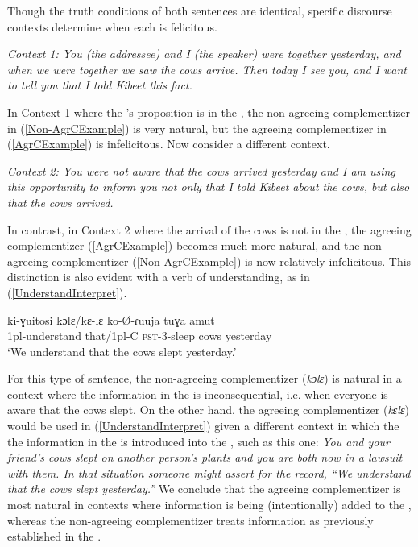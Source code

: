 \documentclass[output=paper
,newtxmath
,modfonts
,nonflat]{langsci/langscibook}
\begin{document}
\noindent Though the  truth conditions of both sentences are identical, specific discourse contexts determine when each is felicitous. 

\ea \textit{Context 1: You (the addressee) and I (the speaker) were together yesterday, and when we were together we saw the cows arrive. Then today I see you, and I want to tell you that I told Kibeet this fact.}  
\z

\noindent In Context 1 where the 's proposition is in the , the non-agreeing complementizer in (\ref{Non-AgrCExample}) is very natural, but the agreeing complementizer in (\ref{AgrCExample}) is infelicitous. Now consider a different context.

\ea \textit{Context 2: You were not aware that the cows arrived yesterday and I am using this opportunity to inform you not only that I told Kibeet about the cows, but also that the cows arrived.} 
\z

\noindent In contrast, in Context 2 where the arrival of the cows is not in the , the agreeing complementizer (\ref{AgrCExample}) becomes much more natural, and the non-agreeing complementizer (\ref{Non-AgrCExample}) is now relatively infelicitous. This distinction is also evident with a verb of understanding, as in (\ref{UnderstandInterpret}). 

\ea \label{UnderstandInterpret}
\gll ki-ɣuitosi kɔlɛ/kɛ-lɛ ko-\O-ɾuuja tuɣa amut \\
1pl-understand that/1pl-C \textsc{pst}-3-sleep cows yesterday \\
\glt `We understand that the cows slept yesterday.'
\z

\noindent For this type of sentence, the non-agreeing complementizer (\textit{kɔlɛ}) is natural in a context where the information in the  is inconsequential, i.e. when everyone is aware that the cows slept. On the other hand, the agreeing complementizer (\textit{kɛlɛ}) would be used in (\ref{UnderstandInterpret}) given a different context in which the the information in the  is introduced into the , such as this one: \textit{You and your friend's cows slept on another person's plants and you are both now in a lawsuit with them. In that situation someone might assert for the record, ``We understand that the cows slept yesterday.''} We conclude that the agreeing complementizer is most natural in contexts where information is being (intentionally) added to the , whereas the non-agreeing complementizer treats information as previously established in the .
\end{document}
